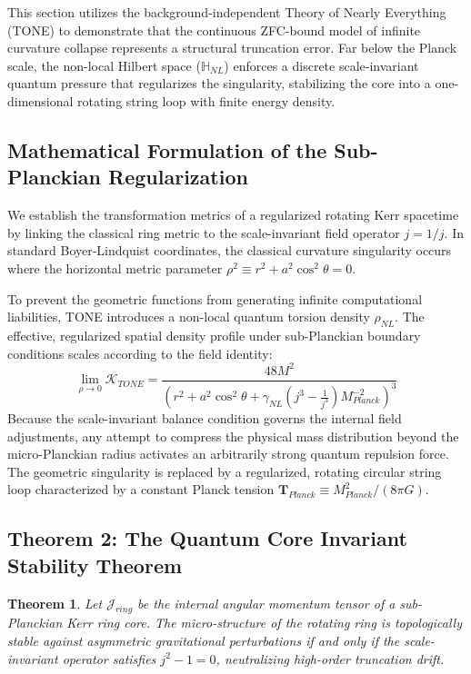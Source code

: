 \documentclass[11pt,a4paper]{article}
\theoremstyle{plain}
\newtheorem{theorem}{Theorem}[section]
\theoremstyle{definition}
\begin{document}
This section utilizes the background-independent Theory of Nearly Everything (TONE) to demonstrate that the continuous ZFC-bound model of infinite curvature collapse represents a structural truncation error. Far below the Planck scale, the non-local Hilbert space ($\mathbb{H}_{NL}$) enforces a discrete scale-invariant quantum pressure that regularizes the singularity, stabilizing the core into a one-dimensional rotating string loop with finite energy density.

\subsection{Mathematical Formulation of the Sub-Planckian Regularization}
We establish the transformation metrics of a regularized rotating Kerr spacetime by linking the classical ring metric to the scale-invariant field operator $j = 1/j$. In standard Boyer-Lindquist coordinates, the classical curvature singularity occurs where the horizontal metric parameter $\rho^2 \equiv r^2 + a^2 \cos^2\theta = 0$. 

To prevent the geometric functions from generating infinite computational liabilities, TONE introduces a non-local quantum torsion density $\rho_{NL}$. The effective, regularized spatial density profile under sub-Planckian boundary conditions scales according to the field identity:
\begin{equation}
\lim_{\rho \to 0} \mathcal{K}_{TONE} = \frac{48 M^2}{\left(r^2 + a^2 \cos^2\theta + \gamma_{NL}\left(j^3 - \frac{1}{j^3}\right) M_{Planck}^{-2}\right)^3}
\end{equation}
Because the scale-invariant balance condition governs the internal field adjustments, any attempt to compress the physical mass distribution beyond the micro-Planckian radius activates an arbitrarily strong quantum repulsion force. The geometric singularity is replaced by a regularized, rotating circular string loop characterized by a constant Planck tension $\mathbf{T}_{Planck} \equiv M_{Planck}^2 / (8\pi G)$.

\subsection{Theorem 2: The Quantum Core Invariant Stability Theorem}
\begin{theorem}
Let $\mathcal{J}_{ring}$ be the internal angular momentum tensor of a sub-Planckian Kerr ring core. The micro-structure of the rotating ring is topologically stable against asymmetric gravitational perturbations if and only if the scale-invariant operator satisfies $j^2 - 1 = 0$, neutralizing high-order truncation drift.
\end{theorem}
\end{document}
